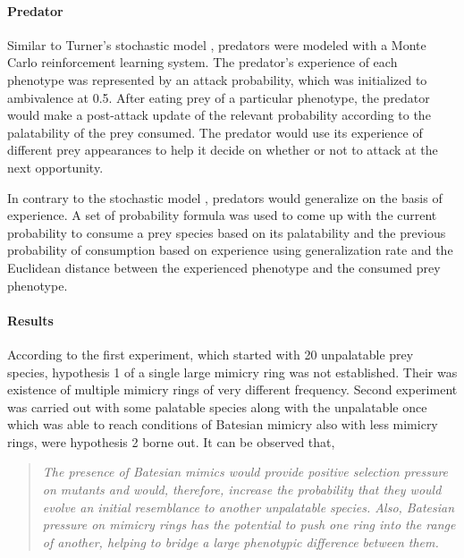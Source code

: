 \paragraph{Predator}
Similar to Turner's stochastic model \cite{turner_et_al1984},  predators were modeled with a Monte Carlo reinforcement learning system. The predator's experience of each phenotype was represented by an attack probability, which was initialized to ambivalence at 0.5. After eating prey of a particular phenotype, the predator would make a post-attack update of the relevant probability according to the palatability of the prey consumed. The predator would use its experience of different prey appearances to help it decide on whether or not to attack at the next opportunity.

In contrary to the stochastic model \cite{turner_et_al1984},  predators would generalize on the basis of experience. A set of probability formula was used to come up with the current probability to consume a prey species based on its palatability and the previous probability of consumption based on experience using generalization rate and the Euclidean distance between the experienced phenotype and the consumed prey phenotype. 

\paragraph{Results}
According to the first experiment, which started with 20 unpalatable prey species, hypothesis 1 of a single large mimicry ring was not established. Their was existence of multiple mimicry rings of very different frequency. Second experiment was carried out with some palatable species along with the unpalatable once which was able to reach conditions of Batesian mimicry also with less mimicry rings, were hypothesis 2 borne out. It can be observed that,

\begin{quote}
\textsl{The presence of Batesian mimics would provide positive selection pressure on mutants and would, therefore, increase the probability that they would evolve an initial resemblance to another unpalatable species. Also, Batesian pressure on mimicry rings has the potential to push one ring into the range of another, helping to bridge a large phenotypic difference between them. \cite{franks2003}}
\end{quote}

